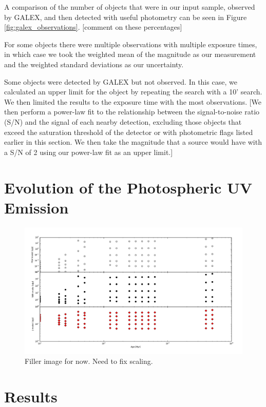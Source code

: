 \documentclass[twocolumn]{aastex62}
\begin{document}
A comparison of the number of objects that were in our input sample, observed by GALEX, and then detected with useful photometry can be seen in Figure \ref{fig:galex_observations}. [comment on these percentages]

For some objects there were multiple observations with multiple exposure times, in which case we took the weighted mean of the magnitude as our measurement and the weighted standard deviations as our uncertainty.

Some objects were detected by GALEX but not observed. In this case, we calculated an upper limit for the object by repeating the search with a 10' search. We then limited the results to the exposure time with the most observations. [We then perform a power-law fit to the relationship between the signal-to-noise ratio (S/N) and the signal of each nearby detection, excluding those objects that exceed the saturation threshold of the detector or with photometric flags listed earlier in this section. We then take the magnitude that a source would have with a S/N of 2 using our power-law fit as an upper limit.]




\section{Evolution of the Photospheric UV Emission}

\begin{figure}[th]
\includegraphics[width=\linewidth]{mfd_vs_age.pdf}
\caption{Filler image for now. Need to fix scaling. \label{fig:mvd_vs_age}}
\end{figure}

\section{Results}
\end{document}
